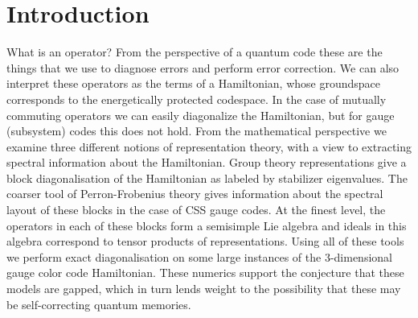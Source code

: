 
\renewenvironment{framed}[1][\hsize]{%
\def\FrameCommand{{\color{black}\vrule width 3pt}\hspace{0pt}\fboxsep=\FrameSep\colorbox{lightgray}}%
\MakeFramed{\hsize0.8\linewidth\advance\hsize-\width\FrameRestore}}
{\endMakeFramed}


\def\Complex{\mathbb{C}}
\def\C{\mathbb{C}}
\def\R{\mathbb{R}}
\def\Z{\mathbb{Z}}
\def\Ham{H} 
\def\Pauli{\mathcal{P}}
\def\Spec{\mbox{Spec}}
\def\Proveit{{\it (Proof??)}}
\def\GL{\mathrm{GL}}
\def\half{\frac{1}{2}}
\def\Stab{S}

\newcommand{\ket}[1]{|{#1}\rangle}
\newcommand{\expect}[1]{\langle{#1}\rangle}
\newcommand{\bra}[1]{\langle{#1}|}
\newcommand{\ketbra}[2]{\ket{#1}\!\bra{#2}}
\newcommand{\braket}[2]{\langle{#1}|{#2}\rangle}

\newcommand{\todo}[1]{\textcolor{red}{#1}}

\def\smbox#1{\ \ \mbox{#1}\ \ }

%
%

\section{Introduction}

What is an operator?
From the perspective of a quantum code these are the
things that we use to diagnose errors and perform error correction.
We can also interpret these operators as the terms of a Hamiltonian, whose
groundspace corresponds to the energetically protected codespace.
In the case of mutually commuting operators we can easily diagonalize the
Hamiltonian, but for gauge (subsystem) codes this does not hold.
From the mathematical perspective we examine three different notions of
representation theory, with a view to extracting
spectral information about the Hamiltonian.
Group theory representations give 
a block diagonalisation of the Hamiltonian as labeled by stabilizer eigenvalues.
The coarser tool of Perron-Frobenius theory gives information about the
spectral layout of these blocks in the case of CSS gauge codes.
At the finest level, the operators in each of these blocks form a semisimple Lie
algebra and ideals in this algebra correspond to tensor products of
representations. 
Using all of these tools we 
perform exact diagonalisation on some 
large instances of the 3-dimensional gauge color code Hamiltonian.
These numerics support the conjecture that these models are gapped,
which in turn lends weight to the possibility that these may
be self-correcting quantum memories.


